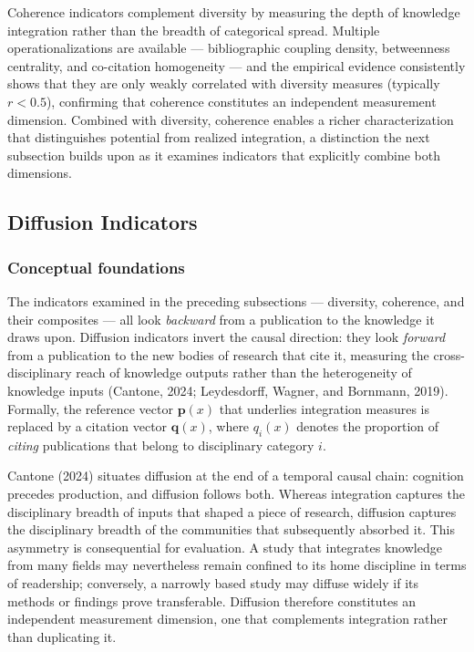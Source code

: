 \documentclass[
]{article}
\begin{document}
Coherence indicators complement diversity by measuring the depth of
knowledge integration rather than the breadth of categorical spread.
Multiple operationalizations are available --- bibliographic coupling
density, betweenness centrality, and co-citation homogeneity --- and the
empirical evidence consistently shows that they are only weakly
correlated with diversity measures (typically \(r < 0.5\)), confirming
that coherence constitutes an independent measurement dimension.
Combined with diversity, coherence enables a richer characterization
that distinguishes potential from realized integration, a distinction
the next subsection builds upon as it examines indicators that
explicitly combine both dimensions.

\hypertarget{diffusion-indicators}{%
\subsection{Diffusion Indicators}\label{diffusion-indicators}}

\hypertarget{conceptual-foundations-1}{%
\subsubsection{Conceptual foundations}\label{conceptual-foundations-1}}

The indicators examined in the preceding subsections --- diversity,
coherence, and their composites --- all look \emph{backward} from a
publication to the knowledge it draws upon. Diffusion indicators invert
the causal direction: they look \emph{forward} from a publication to the
new bodies of research that cite it, measuring the cross-disciplinary
reach of knowledge outputs rather than the heterogeneity of knowledge
inputs (Cantone, 2024; Leydesdorff, Wagner, and Bornmann, 2019).
Formally, the reference vector \(\mathbf{p}(x)\) that underlies
integration measures is replaced by a citation vector \(\mathbf{q}(x)\),
where \(q_i(x)\) denotes the proportion of \emph{citing} publications
that belong to disciplinary category \(i\).

Cantone (2024) situates diffusion at the end of a temporal causal chain:
cognition precedes production, and diffusion follows both. Whereas
integration captures the disciplinary breadth of inputs that shaped a
piece of research, diffusion captures the disciplinary breadth of the
communities that subsequently absorbed it. This asymmetry is
consequential for evaluation. A study that integrates knowledge from
many fields may nevertheless remain confined to its home discipline in
terms of readership; conversely, a narrowly based study may diffuse
widely if its methods or findings prove transferable. Diffusion
therefore constitutes an independent measurement dimension, one that
complements integration rather than duplicating it.
\end{document}
